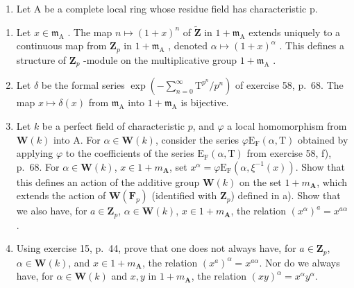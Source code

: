 \begin{enumerate}
\def\labelenumi{\arabic{enumi})}
\setcounter{enumi}{11}
\tightlist
\item
  Let A be a complete local ring whose residue field has characteristic p.
\end{enumerate}

\begin{enumerate}
\def\labelenumi{\alph{enumi})}
\item
  Let \(x \in \mathfrak{m}_{\mathrm{A}}\) . The map \(n \mapsto (1 + x)^n\) of \(\tilde{\mathbf{Z}}\) in \(1 + \mathfrak{m}_{\mathrm{A}}\) extends uniquely to a continuous map from \(\mathbf{Z}_p\) in \(1 + \mathfrak{m}_{\mathrm{A}}\) , denoted \(\alpha \mapsto (1 + x)^{\alpha}\) . This defines a structure of \(\mathbf{Z}_p\) -module on the multiplicative group \(1 + \mathfrak{m}_{\mathrm{A}}\) .
\item
  Let \(\delta\) be the formal series \(\exp\left(-\sum_{n=0}^{\infty}\mathrm{T}^{p^n}/p^n\right)\) of exercise 58, p.~68. The map \(x \mapsto \delta(x)\) from \(\mathfrak{m}_{\mathrm{A}}\) into \(1 + \mathfrak{m}_{\mathrm{A}}\) is bijective.
\item
  Let \(k\) be a perfect field of characteristic \(p\), and \(\varphi\) a local homomorphism from \(\mathbf{W}(k)\) into A. For \(\alpha \in \mathbf{W}(k)\), consider the series \(\varphi \mathrm{E}_{\mathrm{F}}(\alpha, \mathrm{T})\) obtained by applying \(\varphi\) to the coefficients of the series \(\mathrm{E}_{\mathrm{F}}(\alpha, \mathrm{T})\) from exercise 58, f), p.~68. For \(\alpha \in \mathbf{W}(k)\), \(x \in 1 + m_{\mathbf{A}}\), set \(x^{\alpha} = \varphi \mathrm{E}_{\mathrm{F}}(\alpha, \xi^{-1}(x))\). Show that this defines an action of the additive group \(\mathbf{W}(k)\) on the set \(1 + m_{\mathbf{A}}\), which extends the action of \(\mathbf{W}(\mathbf{F}_p)\) (identified with \(\mathbf{Z}_p\)) defined in a). Show that we also have, for \(a \in \mathbf{Z}_p\), \(\alpha \in \mathbf{W}(k)\), \(x \in 1 + m_{\mathbf{A}}\), the relation \((x^{\alpha})^{a} = x^{a\alpha}\).
\item
  Using exercise 15, p.~44, prove that one does not always have, for \(a \in \mathbf{Z}_{p}\), \(\alpha \in \mathbf{W}(k)\), and \(x \in 1 + m_{\mathbf{A}}\), the relation \((x^{a})^{\alpha} = x^{a\alpha}\). Nor do we always have, for \(\alpha \in \mathbf{W}(k)\) and \(x, y\) in \(1 + m_{\mathbf{A}}\), the relation \((xy)^{\alpha} = x^{\alpha}y^{\alpha}\).
\end{enumerate}

